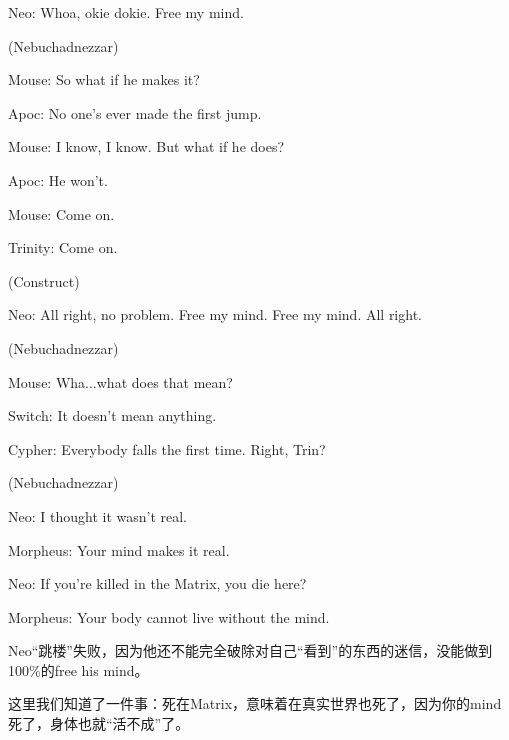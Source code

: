 \documentclass[UTF8]{ctexart}
\newenvironment{myquote}{\color{green} \setlength{\leftskip}{6em} \setlength{\rightskip}{4em} \setlength{\parindent}{-2em}}{\par}
\begin{document}
\begin{myquote}
Neo: Whoa, okie dokie. Free my mind.

(Nebuchadnezzar)

Mouse: So what if he makes it?

Apoc: No one's ever made the first jump.

Mouse: I know, I know. But what if he does?

Apoc: He won't.

Mouse: Come on.

Trinity: Come on.

(Construct)

Neo: All right, no problem. Free my mind. Free my mind. All right.

(Nebuchadnezzar)

Mouse: Wha...what does that mean?

Switch: It doesn't mean anything.

Cypher: Everybody falls the first time. Right, Trin?

(Nebuchadnezzar)

Neo: I thought it wasn't real.

Morpheus: Your mind makes it real.

Neo: If you're killed in the Matrix, you die here?

Morpheus: Your body cannot live without the mind.
\end{myquote}

Neo“跳楼”失败，因为他还不能完全破除对自己“看到”的东西的迷信，没能做到100\%的free his mind。

这里我们知道了一件事：死在Matrix，意味着在真实世界也死了，因为你的mind死了，身体也就“活不成”了。
\end{document}

